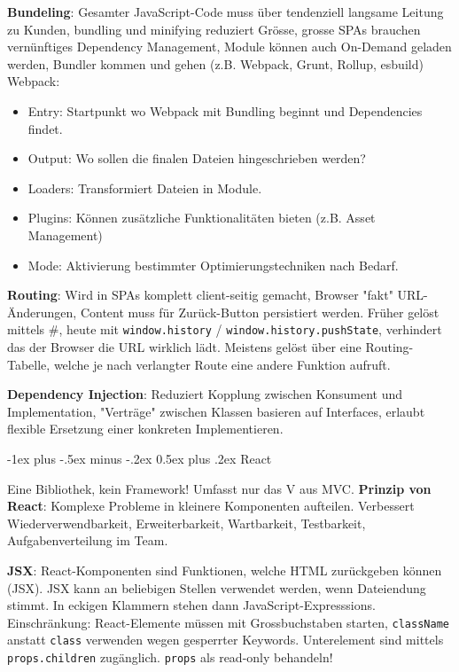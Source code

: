 \documentclass[10pt,landscape]{article}
\makeatletter
\renewcommand{\section}{\@startsection{section}{1}{0mm}%
{-1ex plus -.5ex minus -.2ex}%
{0.5ex plus .2ex}%
{\normalfont\large\bfseries}}
\makeatother
\begin{document}
\begin{multicols}{3}
        \textbf{Bundeling}: Gesamter JavaScript-Code muss über tendenziell langsame Leitung zu Kunden, bundling und minifying reduziert Grösse, grosse SPAs brauchen vernünftiges Dependency Management, Module können auch On-Demand geladen werden, Bundler kommen und gehen (z.B. Webpack, Grunt, Rollup, esbuild)
        Webpack:

        \begin{itemize}
            \item Entry: Startpunkt wo Webpack mit Bundling beginnt und Dependencies findet.
            \item Output: Wo sollen die finalen Dateien hingeschrieben werden?
            \item Loaders: Transformiert Dateien in Module.
            \item Plugins: Können zusätzliche Funktionalitäten bieten (z.B. Asset Management)
            \item Mode: Aktivierung bestimmter Optimierungstechniken nach Bedarf.
        \end{itemize}

        \textbf{Routing}: Wird in SPAs komplett client-seitig gemacht, Browser "fakt" URL-Änderungen, Content muss für Zurück-Button persistiert werden.
        Früher gelöst mittels \#, heute mit \lstinline{window.history} / \lstinline{window.history.pushState}, verhindert das der Browser die URL wirklich lädt.
        Meistens gelöst über eine Routing-Tabelle, welche je nach verlangter Route eine andere Funktion aufruft.

        \textbf{Dependency Injection}: Reduziert Kopplung zwischen Konsument und Implementation, "Verträge" zwischen Klassen basieren auf Interfaces, erlaubt flexible Ersetzung einer konkreten Implementieren.


        \section{React}

        Eine Bibliothek, kein Framework!
        Umfasst nur das V aus MVC.
        \textbf{Prinzip von React}: Komplexe Probleme in kleinere Komponenten aufteilen.
        Verbessert Wiederverwendbarkeit, Erweiterbarkeit, Wartbarkeit, Testbarkeit, Aufgabenverteilung im Team.

        \textbf{JSX}: React-Komponenten sind Funktionen, welche HTML zurückgeben können (JSX).
        JSX kann an beliebigen Stellen verwendet werden, wenn Dateiendung stimmt.
        In eckigen Klammern stehen dann JavaScript-Expresssions.
        Einschränkung: React-Elemente müssen mit Grossbuchstaben starten, \lstinline{className} anstatt \lstinline{class} verwenden wegen gesperrter Keywords.
        Unterelement sind mittels \lstinline{props.children} zugänglich.
        \lstinline{props} als read-only behandeln!


\end{multicols}
\end{document}
